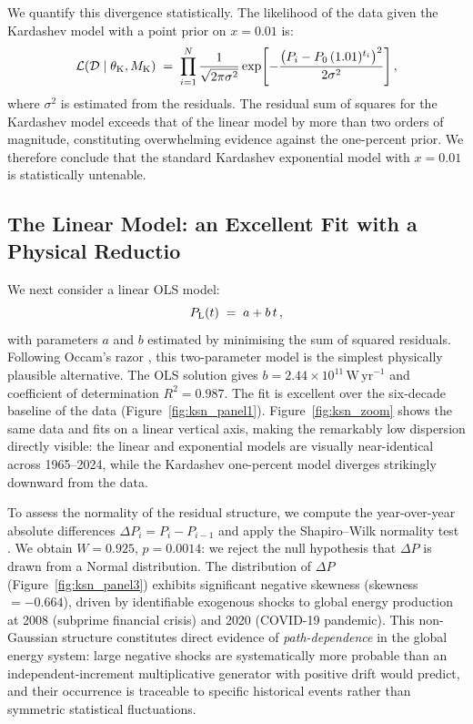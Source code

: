 \documentclass[final,5p,times,twocolumn,authoryear]{elsarticle}
\begin{document}
We quantify this divergence statistically. The likelihood of the data given
the Kardashev model with a point prior on $x = 0.01$ is:
\begin{equation}
    \mathcal{L}(\mathcal{D} \mid \theta_{\rm K}, M_{\rm K})
    \;=\; \prod_{i=1}^{N} \frac{1}{\sqrt{2\pi\sigma^2}}
    \exp\!\left[-\frac{\bigl(P_i - P_0\,(1.01)^{t_i}\bigr)^2}{2\sigma^2}\right],
    \label{eq:likelihood_kard}
\end{equation}
where $\sigma^2$ is estimated from the residuals. The residual sum of squares
for the Kardashev model exceeds that of the linear model by more than two
orders of magnitude, constituting overwhelming evidence against the one-percent
prior. We therefore conclude that the standard Kardashev exponential model
with $x = 0.01$ is statistically untenable.
 
\subsection{The Linear Model: an Excellent Fit with a Physical Reductio}
\label{sec:linear_model}
 
We next consider a linear OLS model:
\begin{equation}
    P_{\rm L}(t) \;=\; a + b\,t\,,
    \label{eq:linear}
\end{equation}
with parameters $a$ and $b$ estimated by minimising the sum of squared
residuals. Following Occam's razor \citep{Blumer1987}, this two-parameter
model is the simplest physically plausible alternative. The OLS solution gives
$b = 2.44 \times 10^{11}\,\mathrm{W\,yr}^{-1}$ and coefficient of
determination $R^2 = 0.987$. The fit is excellent over the six-decade
baseline of the data (Figure~\ref{fig:ksn_panel1}). Figure~\ref{fig:ksn_zoom} 
shows the same data and fits on a linear vertical axis, making the 
remarkably low dispersion directly visible: the linear and exponential 
models are visually near-identical across 1965--2024, while the 
Kardashev one-percent model diverges strikingly downward from the data.
 
To assess the normality of the residual structure, we compute the year-over-year
absolute differences $\Delta P_i = P_i - P_{i-1}$ and apply the Shapiro--Wilk
normality test \citep{Shapiro1965}. We obtain $W = 0.925$, $p = 0.0014$:
we reject the null hypothesis that $\Delta P$ is drawn from a Normal
distribution. The distribution of $\Delta P$ (Figure~\ref{fig:ksn_panel3}) exhibits significant negative
skewness (skewness $= -0.664$), driven by identifiable exogenous shocks to global energy production
at 2008 (subprime financial crisis) and 2020 (COVID-19 pandemic). This
non-Gaussian structure constitutes direct evidence of \emph{path-dependence}
in the global energy system: large negative shocks are systematically more
probable than an independent-increment multiplicative generator with
positive drift would predict, and their occurrence is traceable to specific
historical events rather than symmetric statistical fluctuations.
\end{document}
